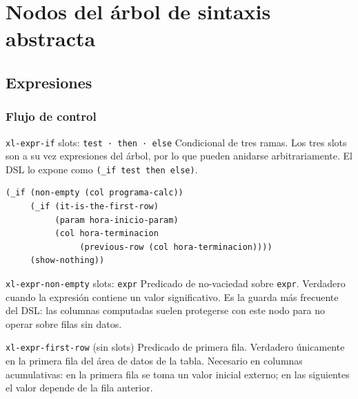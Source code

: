 \documentclass[12pt,a4paper]{report}
\begin{document}
\chapter{Nodos del árbol de sintaxis abstracta}

\section{Expresiones}
\subsection{Flujo de control}

\begin{nodobox}{\texttt{xl-expr-if} \quad \small\textmd{slots:} \texttt{test · then · else}}
Condicional de tres ramas. Los tres slots son a su vez expresiones del árbol, por lo que pueden anidarse arbitrariamente. El DSL lo expone como \texttt{(\_if test then else)}.

\begin{lstlisting}
(_if (non-empty (col programa-calc))
     (_if (it-is-the-first-row)
          (param hora-inicio-param)
          (col hora-terminacion
               (previous-row (col hora-terminacion))))
     (show-nothing))
\end{lstlisting}
\end{nodobox}

\vspace{0.5em}

\begin{nodobox}{\texttt{xl-expr-non-empty} \quad \small\textmd{slots:} \texttt{expr}}
Predicado de no-vaciedad sobre \texttt{expr}. Verdadero cuando la expresión contiene un valor significativo. Es la guarda más frecuente del DSL: las columnas computadas suelen protegerse con este nodo para no operar sobre filas sin datos.
\end{nodobox}

\vspace{0.5em}

\begin{nodobox}{\texttt{xl-expr-first-row} \quad \small\textmd{(sin slots)}}
Predicado de primera fila. Verdadero únicamente en la primera fila del área de datos de la tabla. Necesario en columnas acumulativas: en la primera fila se toma un valor inicial externo; en las siguientes el valor depende de la fila anterior.
\end{nodobox}
\end{document}
